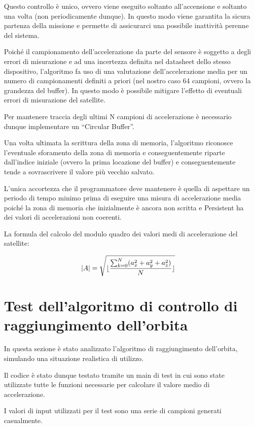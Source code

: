 \documentclass[LaM,binding=0.6cm,oneside]{../sapthesis}
\DeclarePairedDelimiter\floor{\lfloor}{\rfloor}
\begin{document}
Questo controllo è unico, ovvero viene eseguito soltanto all’accensione e soltanto una volta (non periodicamente dunque). In questo modo viene garantita la sicura partenza della missione e permette di assicurarci una possibile inattività perenne del sistema.

Poiché il campionamento dell’accelerazione da parte del sensore è soggetto a degli errori di misurazione e ad una incertezza definita nel datasheet dello stesso dispositivo, l’algoritmo fa uso di una valutazione dell’accelerazione media per un numero di campionamenti definiti a priori (nel nostro caso 64 campioni, ovvero la grandezza del buffer).
In questo modo è possibile mitigare l’effetto di eventuali errori di misurazione del satellite.

Per mantenere traccia degli ultimi N campioni di accelerazione è necessario dunque implementare un “Circular Buffer”.

Una volta ultimata la scrittura della zona di memoria, l’algoritmo riconosce l’eventuale sforamento della zona di memoria e conseguentemente riparte dall’indice iniziale (ovvero la prima locazione del buffer) e conseguentemente tende a sovrascrivere il valore più vecchio salvato.

L’unica accortezza che il programmatore deve mantenere è quella di aspettare un periodo di tempo minimo prima di eseguire una misura di accelerazione media poiché la zona di memoria che inizialmente è ancora non scritta e Persistent ha dei valori di accelerazioni non coerenti.

La formula del calcolo del modulo quadro dei valori medi di accelerazione del satellite:

\begin{equation}
    |A| = \sqrt{\floor{\frac{\sum_{k=0}^N (a_x^2+a_y^2+a_z^2) }{N} } }
\end{equation}

\section{Test dell'algoritmo di controllo di raggiungimento dell'orbita}

In questa sezione è stato analizzato l'algoritmo di raggiungimento dell'orbita, simulando una situazione realistica di utilizzo.

Il codice è stato dunque testato tramite un main di test in cui sono state utilizzate tutte le funzioni necessarie per calcolare il valore medio di accelerazione.

I valori di input utilizzati per il test sono una serie di campioni generati casualmente.
\end{document}
